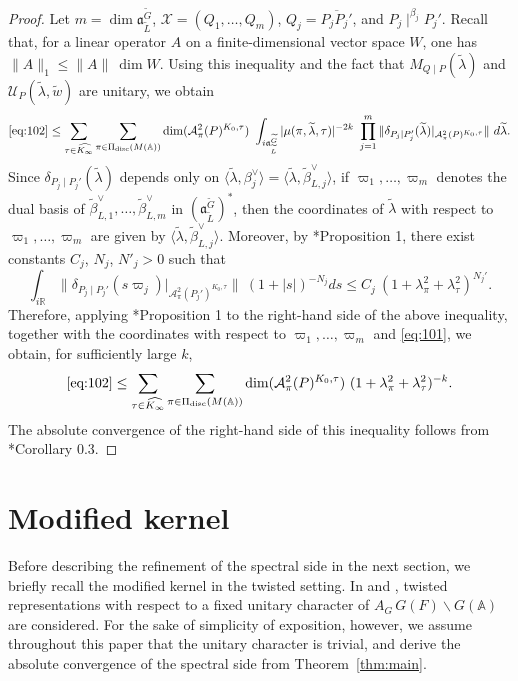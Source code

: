 \documentclass[12pt]{amsart}
\theoremstyle{definition}
\theoremstyle{plain}
\theoremstyle{remark}
\def\R{\mathbb{R}}%
\def\A{\mathbb{A}}%
\def\inf{\infty}
\def\bs{\backslash}%
\newcommand{\fa}{\mathfrak{a}}
\newcommand{\cA}{\mathcal{A}}
\newcommand{\cU}{\mathcal{U}}
\newcommand{\cX}{\mathcal{X}}
\numberwithin{equation}{section}
\newcommand{\disc}{\mathrm{disc}}
\newcommand{\tG}{\widetilde{G}}
\newcommand{\tL}{\widetilde{L}}
\newcommand{\tbeta}{\widetilde{\beta}}
\newcommand{\tlambda}{\widetilde{\lambda}}
\newcommand{\tw}{\widetilde{w}}
\begin{document}
\begin{proof}
    
    Let $m=\dim\fa_{\tL}^{\tG}$, $\cX=(Q_1,\dots,Q_m)$, $Q_j=\overline{P_jP_j'}$, and $P_j\mid^{\beta_j}P_j'$.
    Recall that, for a linear operator $A$ on a finite-dimensional vector space $W$, one has $\|A\|_1\le \|A\| \ \dim W$.
    Using this inequality and the fact that $M_{Q\mid P}(\tlambda)$ and $\cU_P(\tlambda,\tw)$ are unitary, we obtain
    \[
    \eqref{eq:102}\le \sum_{\tau\in\widehat
    {K_\inf}}\sum_{\pi\in\Pi_{\disc}(M(\A))}\dim(\cA^2_\pi(P)^{K_0,\tau})\ \int_{i\fa_{\tL}^{\tG}} |\mu(\pi,\tlambda,\tau)|^{-2k} \ \prod_{j=1}^m \| \delta_{P_j\mid P_j'}(\tlambda)|_{\cA^2_\pi(P)^{K_0,\tau}}\|\ d\tlambda.
    \]
    Since $\delta_{P_j\mid P_j'}(\tlambda)$ depends only on $\langle\tlambda,\beta_j^\vee\rangle=\langle\tlambda,\tbeta_{L,j}^\vee\rangle$, if $\varpi_1,\dots,\varpi_m$ denotes the dual basis of $\tbeta_{L,1}^\vee,\dots,\tbeta_{L,m}^\vee$ in $(\fa_{\tL}^{\tG})^*$, then the coordinates of $\tlambda$ with respect to $\varpi_1,\dots,\varpi_m$ are given by $\langle\tlambda,\tbeta_{L,j}^\vee\rangle$.
    Moreover, by \cite{FLM11}*{Proposition 1}, there exist constants $C_j$, $N_j$, $N'_j>0$ such that
    \[
    \int_{i \R} \| \delta_{P_j\mid P_j'}(s\varpi_j)|_{\cA^2_\pi(P_j')^{K_0,\tau}}  \| \ (1+|s|)^{-N_j} ds
    \le C_j \ (1+\lambda_\pi^2+\lambda_\tau^2)^{N_j'}.
    \]
    Therefore, applying \cite{FLM11}*{Proposition 1} to the right-hand side of the above inequality, together with the coordinates with respect to $\varpi_1,\dots,\varpi_m$ and \eqref{eq:101}, we obtain, for sufficiently large $k$,
    \[
    \eqref{eq:102}\le \sum_{\tau\in\widehat
    {K_\inf}}\sum_{\pi\in\Pi_{\disc}(M(\A))}\dim(\cA^2_\pi(P)^{K_0,\tau})\ (1+\lambda_\pi^2+\lambda_\tau^2)^{-k}.
    \]
    The absolute convergence of the right-hand side of this inequality follows from \cite{Mul89}*{Corollary 0.3}.
\end{proof}


\section{Modified kernel}\label{sec:kernel}

Before describing the refinement of the spectral side in the next section, we briefly recall the modified kernel in the twisted setting.
In \cite{LW13} and \cite{Par19}, twisted representations with respect to a fixed unitary character of $A_G\, G(F)\bs G(\A)$ are considered.
For the sake of simplicity of exposition, however, we assume throughout this paper that the unitary character is trivial, and derive the absolute convergence of the spectral side from Theorem~\ref{thm:main}.
\end{document}
